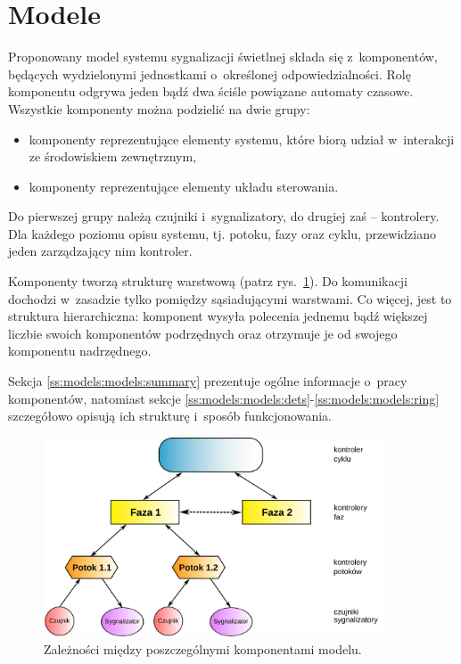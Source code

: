 \documentclass{pracamgr}
\newcommand{\imgr}[1]{rys.~\ref{#1}}
\theoremstyle{plain}
\begin{document}
\section{Modele}
\label{s:models:models}
Proponowany model systemu sygnalizacji świetlnej składa się
z~komponentów, będących wydzielonymi jednostkami o~określonej
odpowiedzialności. Rolę komponentu odgrywa jeden bądź dwa ściśle
powiązane automaty czasowe. Wszystkie komponenty można podzielić na
dwie grupy:
\begin{itemize}
  \item komponenty reprezentujące elementy systemu, które biorą udział
  w~interakcji ze środowiskiem zewnętrznym,
  \item komponenty reprezentujące elementy układu sterowania.
\end{itemize}
Do pierwszej grupy należą czujniki i~sygnalizatory, do drugiej zaś --
kontrolery. Dla każdego poziomu opisu systemu, tj. potoku, fazy oraz
cyklu, przewidziano jeden zarządzający nim kontroler.

Komponenty tworzą strukturę warstwową (patrz \imgr{img:hierarchy}). Do
komunikacji dochodzi w~zasadzie tylko pomiędzy sąsiadującymi
warstwami. Co więcej, jest to struktura hierarchiczna: komponent
wysyła polecenia jednemu bądź większej liczbie swoich komponentów
podrzędnych oraz otrzymuje je od swojego komponentu nadrzędnego.

Sekcja \ref{ss:models:models:summary} prezentuje ogólne informacje
o~pracy komponentów, natomiast sekcje
\ref{ss:models:models:dets}-\ref{ss:models:models:ring} szczegółowo
opisują ich strukturę i~sposób funkcjonowania.

\begin{figure}[h]
  \centering
  \includegraphics[width=0.9\textwidth]{img/models-hierarchy}
  \caption{Zależności między poszczególnymi komponentami modelu.}
  \label{img:hierarchy}
\end{figure}
\end{document}
